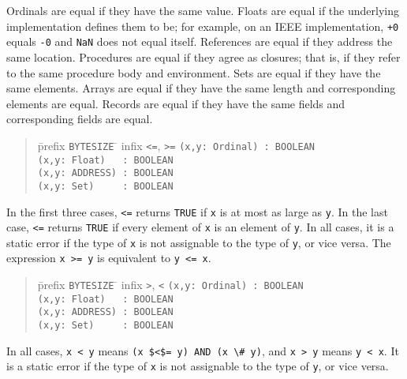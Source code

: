 \documentclass[10pt]{article}
\begin{document}
Ordinals are equal if they have the same value.  Floats are equal if the
underlying implementation defines them to be; for example, on an IEEE
implementation, \verb|+0| equals \verb|-0| and \verb|NaN| does not equal
itself.  References are equal if they address the same location.  Procedures
are equal if they agree as closures; that is, if they refer to the same
procedure body and environment.  Sets are equal if they have the same
elements.  Arrays are equal if they have the same length and corresponding
elements are equal.  Records are equal if they have the same fields and
corresponding fields are equal.

\begin{quote}
  \begin{tabbing}
    \=prefix \= \verb|BYTESIZE| \= \kill
    \>infix  \> \verb|<=|, \verb|>=| \> \verb|(x,y: Ordinal) : BOOLEAN| \\
    \>       \>                      \> \verb|(x,y: Float)   : BOOLEAN| \\
    \>       \>                      \> \verb|(x,y: ADDRESS) : BOOLEAN| \\
    \>       \>                      \> \verb|(x,y: Set)     : BOOLEAN|
  \end{tabbing}
\end{quote}
In the first three cases, \verb|<=| returns \verb|TRUE| if \verb|x| is at most
as large as \verb|y|.  In the last case, \verb|<=| returns \verb|TRUE| if
every element of \verb|x| is an element of \verb|y|.  In all cases, it is a
static error if the type of \verb|x| is not assignable to the type of
\verb|y|, or vice versa.  The expression \verb|x >= y| is equivalent to
\verb|y <= x|.

\begin{quote}
  \begin{tabbing}
    \=prefix \= \verb|BYTESIZE| \= \kill
    \>infix  \> \verb|>|, \verb|<| \> \verb|(x,y: Ordinal) : BOOLEAN| \\
    \>       \>                    \> \verb|(x,y: Float)   : BOOLEAN| \\
    \>       \>                    \> \verb|(x,y: ADDRESS) : BOOLEAN| \\
    \>       \>                    \> \verb|(x,y: Set)     : BOOLEAN|
  \end{tabbing}
\end{quote}
In all cases, \verb|x < y| means \verb|(x $<$= y) AND (x \# y)|, and
\verb|x > y| means \verb|y < x|.  It is a static error if the type of \verb|x|
is not assignable to the type of \verb|y|, or vice versa.
\end{document}
